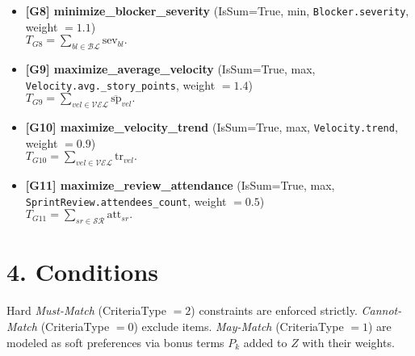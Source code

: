 \documentclass[11pt,a4paper]{article}
\begin{document}
\begin{itemize}[leftmargin=*]
  \item \textbf{[G8] minimize\_blocker\_severity} (IsSum=True, min, \texttt{Blocker.severity}, weight $=1.1$)\\
  $T_{G8}=\displaystyle \sum_{bl\in\mathcal{BL}} \text{sev}_{bl}.$

  \item \textbf{[G9] maximize\_average\_velocity} (IsSum=True, max, \texttt{Velocity.avg.\_story\_points}, weight $=1.4$)\\
  $T_{G9}=\displaystyle \sum_{vel\in\mathcal{VEL}} \overline{\text{sp}}_{\!vel}.$

  \item \textbf{[G10] maximize\_velocity\_trend} (IsSum=True, max, \texttt{Velocity.trend}, weight $=0.9$)\\
  $T_{G10}=\displaystyle \sum_{vel\in\mathcal{VEL}} \text{tr}_{vel}.$

  \item \textbf{[G11] maximize\_review\_attendance} (IsSum=True, max, \texttt{SprintReview.attendees\_count}, weight $=0.5$)\\
  $T_{G11}=\displaystyle \sum_{sr\in\mathcal{SR}} \text{att}_{sr}.$
\end{itemize}

\section{4. Conditions}
Hard \emph{Must-Match} (CriteriaType $=2$) constraints are enforced strictly.
\emph{Cannot-Match} (CriteriaType $=0$) exclude items.
\emph{May-Match} (CriteriaType $=1$) are modeled as soft preferences via bonus terms $P_k$ added to $Z$ with their weights.
\end{document}
